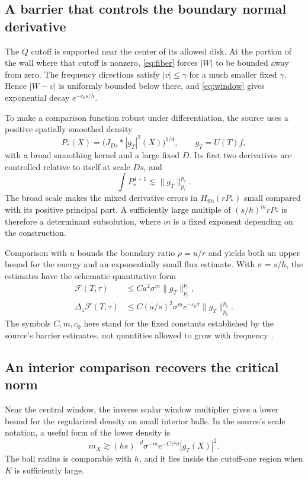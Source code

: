 \documentclass[11pt,a4paper]{article}
\numberwithin{equation}{section}
\theoremstyle{definition}
\theoremstyle{remark}
\newcommand{\pc}{p_{\mathrm c}}
\begin{document}
\subsection{A barrier that controls the boundary normal derivative}
The $Q$ cutoff is supported near the center of its allowed disk. At the portion
of the wall where that cutoff is nonzero, \eqref{eq:fiber} forces $|W|$ to be
bounded away from zero. The frequency directions satisfy $|v|\le\gamma$ for
a much smaller fixed $\gamma$. Hence $|W-v|$ is uniformly bounded below there,
and \eqref{eq:window} gives exponential decay $e^{-c_0s/h}$.

To make a comparison function robust under differentiation, the source uses a
positive spatially smoothed density
\[
 P_*(X)=\bigl(J_{Ds}*|g_T|^2(X)\bigr)^{1/d},
 \qquad g_T=U(T)f,
\]
with a broad smoothing kernel and a large fixed $D$. Its first two derivatives
are controlled relative to itself at scale $Ds$, and
\begin{equation}\label{eq:psmooth}
 \int P_*^{d+1}\lesssim\|g_T\|_{\pc}^{\pc}.
\end{equation}
The broad scale makes the mixed derivative errors in $H_{\mathrm{fib}}(rP_*)$
small compared with its positive principal part. A sufficiently large
multiple of $(s/h)^m rP_*$ is therefore a determinant subsolution, where $m$
is a fixed exponent depending on the construction.

Comparison with $u$ bounds the boundary ratio $\rho=u/r$ and yields both an
upper bound for the energy and an exponentially small flux estimate. With
$\sigma=s/h$, the estimates have the schematic quantitative form
\begin{align}
 \mathcal F(T,\tau)&\le C a^2\sigma^m\|g_T\|_{\pc}^{\pc},
                                                    \label{eq:upperF}\\
 \Delta_z\mathcal F(T,\tau)&\le
 C(a/s)^2\sigma^m e^{-c_0\sigma}\|g_T\|_{\pc}^{\pc}.
                                                    \label{eq:fluxF}
\end{align}
The symbols $C,m,c_0$ here stand for the fixed constants established by the
source's barrier estimates, not quantities allowed to grow with frequency
\cite{barrier}.

\subsection{An interior comparison recovers the critical norm}
Near the central window, the inverse scalar window multiplier gives a lower
bound for the regularized density on small interior balls. In the source's
scale notation, a useful form of the lower density is
\[
 m_X\gtrsim (hs)^{-d}\sigma^{-m}e^{-C\gamma^2\sigma}|g_T(X)|^2.
\]
The ball radius is comparable with $h$, and it lies inside the cutoff-one
region when $K$ is sufficiently large.
\end{document}
